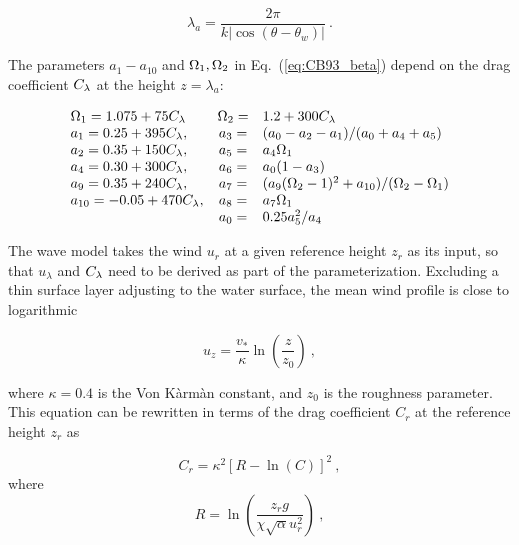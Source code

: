 \begin{equation}
\lambda_a = \frac{ 2 \pi }{ k | \cos(\theta-\theta_w) | }
\: . \label{eq:CB93_lam} \end{equation}

\noindent
The parameters $a_1-a_{10}$ and $\Omega_1,\Omega_2$ in Eq.~(\ref{eq:CB93_beta})
depend on the drag coefficient $C_{\lambda}$ at the height $z=\lambda_a$:


\begin{equation} \begin{array}{lcl}
\Om_1=1.075+75\CL  &\Om_2=& 1.2+300\CL                     \\
a_1=0.25+395\CL,    &a_3 =& (a_0-a_2-a_1)/(a_0+a_4+a_5)    \\
a_2=0.35+150\CL,    &a_5 =& a_4\Om_1                       \\
a_4=0.30+300\CL,    &a_6 =& a_0(1-a_3)                     \\
a_9=0.35+240\CL,    &a_7 =&
                     (a_9(\Om_2-1)^2+a_{10})/(\Om_2-\Om_1) \\
a_{10}=-0.05+470\CL,&a_8 =& a_7\Om_1                       \\
                    &a_0 =& 0.25 a_5^2/a_4
\end{array} \label{eq:omapar} \end{equation}

\noindent
The wave model takes the wind $u_r$ at a given reference height $z_r$ as its
input, so that $u_\lambda$ and $C_{\lambda}$ need to be derived as part of the
parameterization. Excluding a thin surface layer adjusting to the water
surface, the mean wind profile is close to logarithmic


\begin{equation}
u_z = \frac{v_\ast}{\kappa} \ln \left ( \frac{z}{z_0} \right )
\: , \label{eq:u_z}
\end{equation}

\noindent
where $\kappa = 0.4 $ is the Von K\`{a}rm\`{a}n constant, and $z_0$ is the
roughness parameter. This equation can be rewritten in terms of the drag
coefficient $C_r$ at the reference height $z_r$ as \citep{art:Cha95}


\begin{equation}
C_r = \kappa^2 \left [ R - \ln(C) \right ] ^2
\: , \label{eq:C95C} \end{equation} where \begin{equation}
R = \ln \left ( \frac{z_r g}{\chi \sqrt{\alpha} u_r^2} \right )
\: , \label{eq:C95R} \end{equation}

